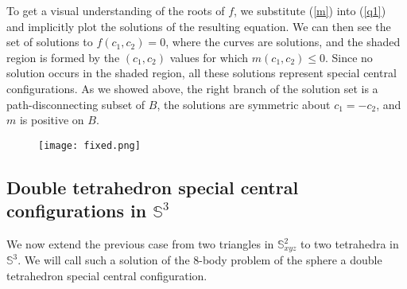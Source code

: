 \documentclass[12pt]{amsart}
\theoremstyle{definition}
\def \mb{\mathbb}
\def \S{\mb S}        %
\begin{document}
{To get a visual understanding of the roots of $f$, we substitute (\ref{m}) into (\ref{q1}) and implicitly plot the solutions of the resulting equation. We can then see the set of solutions to $f(c_1,c_2)=0$, 
where the curves are solutions, and the  shaded region is formed by the $(c_1, c_2)$ values for which $m(c_1,c_2)\leq 0$. Since no solution occurs in the  shaded region, all these solutions represent special central configurations. As we showed above, the right branch of the solution set is a path-disconnecting subset of $B$, the solutions are symmetric about $c_1=-c_2$, and $m$ is positive on $B$.



\begin{figure}[htbp] 
   \centering
   \texttt{[image: fixed.png]}
    \caption{}
   \label{Fig2}
\end{figure}

\smallskip



\subsection{Double tetrahedron special central configurations in $\S^3$}
We now extend the previous case from two triangles in $\S^2_{xyz}$ to two tetrahedra in $\S^3$. We will call such a solution of the 8-body problem of the sphere a
double tetrahedron special central configuration.


}
\end{document}

